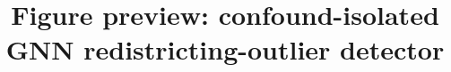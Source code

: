 \documentclass[conference]{IEEEtran}
\begin{document}
\title{Figure preview: confound-isolated GNN redistricting-outlier detector}
\author{}
\maketitle






\end{document}
